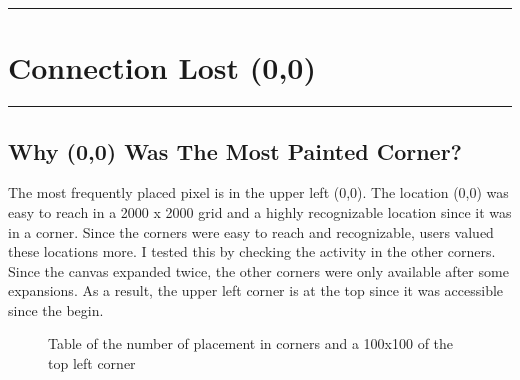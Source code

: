 {\color{gray}\hrule}
\section{Connection Lost (0,0)}
{\color{gray}\hrule}

\subsection{Why (0,0) Was The Most Painted Corner?}
The most frequently placed pixel is in the upper left (0,0). The location (0,0) was easy to reach in a 2000 x 2000 grid and a highly recognizable location since it was in a corner. Since the corners were easy to reach and recognizable, users valued these locations more. I tested this by checking the activity in the other corners. Since the canvas expanded twice, the other corners were only available after some expansions. As a result, the upper left corner is at the top since it was accessible since the begin.

\begin{figure}[H]
    \centering
    \caption{Table of the number of placement in corners and a 100x100 of the top left corner}
\end{figure}

